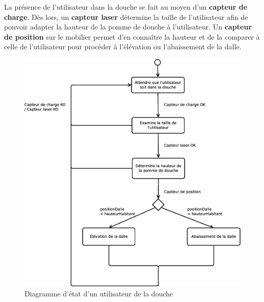 La présence de l'utilisateur dans la douche se fait au moyen d'un \textbf{capteur de charge}. Dès lors, un \textbf{capteur laser} détermine la taille de l'utilisateur afin de pouvoir adapter la hauteur de la pomme de douche à l'utilisateur. Un \textbf{capteur de position} sur le mobilier permet d'en connaître la hauteur et de la comparer à celle de l'utilisateur pour procéder à l'élévation ou l'abaissement de la dalle. 
\begin{figure}[H]
	\centering
	\includegraphics[width=1\linewidth]{diagrams/bathroom/diagramme_etat_st2.eps}
	\caption{Diagramme d'état d'un utilisateur de la douche}
	\label{fig:diagramme_st2}
\end{figure}
